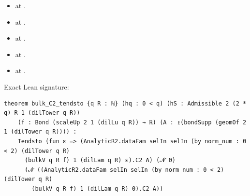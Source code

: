 \begin{theorem}[bp-116]
\begin{itemize}
\item \texttt{} at \texttt{}.
\item \texttt{} at \texttt{}.
\item \texttt{} at \texttt{}.
\item \texttt{} at \texttt{}.
\item \texttt{} at \texttt{}.
\end{itemize}
\par Exact Lean signature:
\begin{verbatim}
theorem bulk_C2_tendsto {q R : ℕ} (hq : 0 < q) (hS : Admissible 2 (2 * q) R 1 (dilTower q R))
    (f : Bond (scaleUp 2 1 (dilLu q R)) → ℝ) (A : ↥(bondSupp (geomOf 2 1 (dilTower q R)))) :
    Tendsto (fun ε => (AnalyticR2.dataFam selIn selIn (by norm_num : 0 < 2) (dilTower q R)
      (bulkV q R f) 1 (dilLam q R) ε).C2 A) (𝓝 0)
      (𝓝 ((AnalyticR2.dataFam selIn selIn (by norm_num : 0 < 2) (dilTower q R)
        (bulkV q R f) 1 (dilLam q R) 0).C2 A))
\end{verbatim}
\end{theorem}

